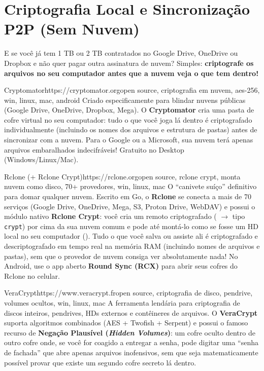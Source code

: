 \documentclass{pousadaguide}
\begin{document}
\section{Criptografia Local e Sincronização P2P (Sem Nuvem)}

E se você já tem 1 TB ou 2 TB contratados no Google Drive, OneDrive ou Dropbox e não quer pagar outra assinatura de nuvem? Simples: \textbf{criptografe os arquivos no seu computador antes que a nuvem veja o que tem dentro!}

\begin{ferramenta}[goat,logo=cryptomator]{Cryptomator}{https://cryptomator.org}{open source, criptografia em nuvem, aes-256, win, linux, mac, android}
Criado especificamente para blindar nuvens públicas (Google Drive, OneDrive, Dropbox, Mega). O \textbf{Cryptomator} cria uma pasta de cofre virtual no seu computador: tudo o que você joga lá dentro é criptografado individualmente (incluindo os nomes dos arquivos e estrutura de pastas) antes de sincronizar com a nuvem. Para o Google ou a Microsoft, sua nuvem terá apenas arquivos embaralhados indecifráveis! Gratuito no Desktop (Windows/Linux/Mac). 
\end{ferramenta}

\begin{ferramenta}[goat,logo=rclone]{Rclone (+ Rclone Crypt)}{https://rclone.org}{open source, rclone crypt, monta nuvem como disco, 70+ provedores, win, linux, mac}
O ``canivete suíço'' definitivo para domar qualquer nuvem. Escrito em Go, o \textbf{Rclone} se conecta a mais de 70 serviços (Google Drive, OneDrive, Mega, S3, Proton Drive, WebDAV) e possui o módulo nativo \textbf{Rclone Crypt}: você cria um remoto criptografado ( $\to$ tipo \texttt{crypt}) por cima da sua nuvem comum e pode até montá-lo como se fosse um HD local no seu computador (). Tudo o que você salva ou assiste ali é criptografado e descriptografado em tempo real na memória RAM (incluindo nomes de arquivos e pastas), sem que o provedor de nuvem consiga ver absolutamente nada! No Android, use o app aberto \textbf{Round Sync (RCX)} para abrir seus cofres do Rclone no celular. 
\end{ferramenta}

\begin{ferramenta}[goat,logo=veracrypt]{VeraCrypt}{https://www.veracrypt.fr}{open source, criptografia de disco, pendrive, volumes ocultos, win, linux, mac}
A ferramenta lendária para criptografia de discos inteiros, pendrives, HDs externos e contêineres de arquivos. O \textbf{VeraCrypt} suporta algoritmos combinados (AES + Twofish + Serpent) e possui o famoso recurso de \textbf{Negação Plausível (\emph{Hidden Volumes})}: um cofre oculto dentro de outro cofre onde, se você for coagido a entregar a senha, pode digitar uma ``senha de fachada'' que abre apenas arquivos inofensivos, sem que seja matematicamente possível provar que existe um segundo cofre secreto lá dentro. 
\end{ferramenta}
\end{document}

